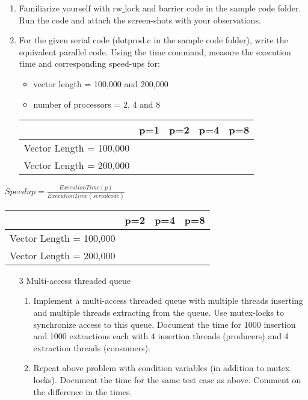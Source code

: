 \documentclass{sem5}
\author{Dilip Puri}
\begin{document}
\begin{enumerate}
\item Familiarize yourself with rw$\_$lock and barrier code in the sample code folder. Run the code and attach the screen-shots with your observations.
\item For the given serial code (dotprod.c in the sample code folder), write the equivalent parallel code. Using the time command, measure the execution time and corresponding speed-ups for:\\
\begin{itemize}
\item vector length = 100,000 and 200,000
\item number of processors = 2, 4 and 8
\end{itemize}
\begin{center}
\begin{tabular}{|c|c|c|c|c|}
\hline
& p=1 & p=2 & p=4 & p=8\\
\hline
Vector Length = 100,000 & & & & \\
\hline
Vector Length = 200,000 & & & & \\
\hline
\end{tabular}

\end{center}
\end{enumerate}
\begin{center}
$Speedup = \frac{Execution Time(p)}{Execution Time(serial code)}$\\
\vspace*{1cm}
\begin{tabular}{|c|c|c|c|}
\hline
 & p=2 & p=4 & p=8\\
\hline
Vector Length = 100,000 & & & \\
\hline
Vector Length = 200,000 & & & \\
\hline
\end{tabular}
\end{center}
\begin{itemize}
\item[3] Multi-access threaded queue
\begin{enumerate}
\item Implement a multi-access threaded queue with multiple threads inserting and multiple threads extracting from the queue. Use mutex-locks to synchronize access to this queue. Document the time for 1000 insertion and 1000 extractions each with 4 insertion threads (producers) and 4 extraction threads (consumers).

\item Repeat above problem with condition variables (in addition to mutex locks). Document the time for the same test case as above. Comment on the difference in the times.

\end{enumerate}
\end{itemize}
\end{document}
